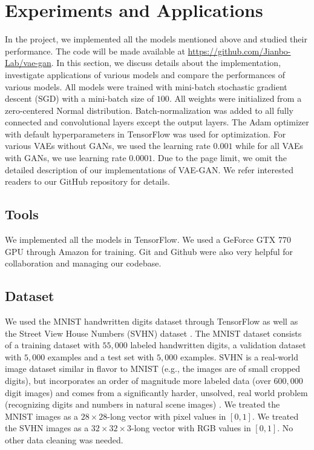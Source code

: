 \documentclass[10pt]{article}
\begin{document}
\section{Experiments and Applications}
In the project, we implemented all the models mentioned above and studied their performance.
The code will be made available at \href{url}{https://github.com/Jianbo-Lab/vae-gan}.
In this section, we discuss details about the implementation, investigate applications of various models and compare the performances of various models.
All models were trained with mini-batch stochastic gradient descent (SGD) with a mini-batch size of $100$. All weights were initialized from a zero-centered Normal distribution. Batch-normalization \cite{sergey2015batchnorm} was added to all fully connected and convolutional layers except the output layers.
The Adam \cite{kingma2014adam} optimizer with default hyperparameters in TensorFlow was used for optimization. For various VAEs without GANs, we used the learning rate $0.001$ while for all VAEs with GANs, we use learning rate $0.0001$.
Due to the page limit, we omit the detailed description of our implementations of VAE-GAN. We refer interested readers to our GitHub repository for details.
\subsection{Tools}
We implemented all the models in TensorFlow. We used a GeForce GTX 770 GPU through Amazon for training. Git and Github were also very helpful for collaboration and managing our codebase.
\subsection{Dataset}
We used the MNIST handwritten digits dataset \cite{lecun1998gradient} through TensorFlow as well as the Street View House Numbers (SVHN) dataset \cite{netzer2011reading}. The MNIST dataset consists of a training dataset with $55,000$ labeled handwritten digits, a validation dataset with $5,000$ examples and a test set with $5,000$ examples. SVHN is a real-world image dataset similar in flavor to MNIST (e.g., the images are of small cropped digits), but incorporates an order of magnitude more labeled data (over $600,000$ digit images) and comes from a significantly harder, unsolved, real world problem (recognizing digits and numbers in natural scene images) \cite{netzer2011reading}.
We treated the MNIST images as a $28\times 28$-long vector with pixel values in $[0,1]$. We treated the SVHN images as a $32 \times 32 \times 3$-long vector with RGB values in $[0,1]$. No other data cleaning was needed.
\end{document}
